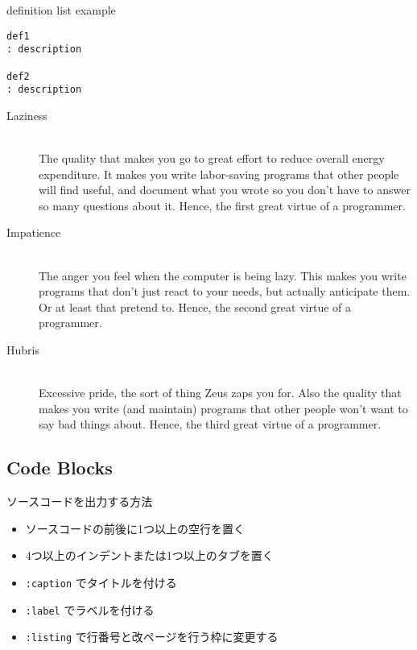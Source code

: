 \documentclass[a4j]{jarticle}
\begin{document}
\begin{itembox}[c]{definition list example}
\begin{verbatim}
def1
: description

def2
: description
\end{verbatim}
\end{itembox}

\begin{description}
\item[Laziness]\mbox{}\\ The quality that makes you go to great effort to reduce overall energy expenditure. It makes you write labor-saving programs that other people will find useful, and document what you wrote so you don't have to answer so many questions about it. Hence, the first great virtue of a programmer.



\item[Impatience]\mbox{}\\ The anger you feel when the computer is being lazy. This makes you write programs that don't just react to your needs, but actually anticipate them. Or at least that pretend to. Hence, the second great virtue of a programmer.



\item[Hubris]\mbox{}\\ Excessive pride, the sort of thing Zeus zaps you for. Also the quality that makes you write (and maintain) programs that other people won't want to say bad things about. Hence, the third great virtue of a programmer.
\end{description}

\subsection{Code Blocks}

ソースコードを出力する方法

\begin{itemize}
\item ソースコードの前後に1つ以上の空行を置く
\item 4つ以上のインデントまたは1つ以上のタブを置く
\item {\tt :caption} でタイトルを付ける
\item {\tt :label} でラベルを付ける
\item {\tt :listing} で行番号と改ページを行う枠に変更する
\end{itemize}
\end{document}
